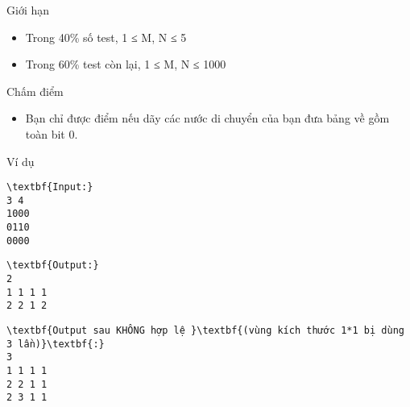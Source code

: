 Giới hạn  
\begin{itemize}
	\item     Trong 40\% số test, 1 ≤ M, N ≤ 5   
	\item     Trong 60\% test còn lại, 1 ≤ M, N ≤ 1000   
\end{itemize}
   Chấm điểm  
\begin{itemize}
	\item     Bạn chỉ được điểm nếu dãy các nước di chuyển của bạn đưa bảng về gồm toàn bit 0.   
\end{itemize}
   Ví dụ  
\begin{verbatim}
\textbf{Input:}
3 4
1000
0110
0000
\end{verbatim}
\begin{verbatim}
\textbf{Output:}
2
1 1 1 1
2 2 1 2
\end{verbatim}
\begin{verbatim}
\textbf{Output sau KHÔNG hợp lệ }\textbf{(vùng kích thước 1*1 bị dùng 3 lần)}\textbf{:}
3
1 1 1 1
2 2 1 1
2 3 1 1
\end{verbatim}